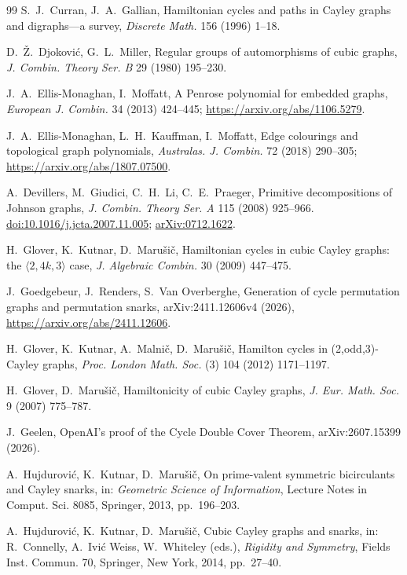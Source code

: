 \documentclass[11pt,a4paper]{article}
\theoremstyle{definition}
\theoremstyle{remark}
\begin{document}
\begin{thebibliography}{99}
 S.~J.~Curran, J.~A.~Gallian, Hamiltonian cycles and paths in Cayley graphs and digraphs---a survey, \emph{Discrete Math.} 156 (1996) 1--18.

 D.~\v{Z}.~Djokovi\'c, G.~L.~Miller, Regular groups of automorphisms of cubic graphs, \emph{J. Combin. Theory Ser. B} 29 (1980) 195--230.

 J.~A.~Ellis-Monaghan, I.~Moffatt, A Penrose polynomial for embedded graphs, \emph{European J. Combin.} 34 (2013) 424--445; \url{https://arxiv.org/abs/1106.5279}.

 J.~A.~Ellis-Monaghan, L.~H.~Kauffman, I.~Moffatt, Edge colourings and topological graph polynomials, \emph{Australas. J. Combin.} 72 (2018) 290--305; \url{https://arxiv.org/abs/1807.07500}.

 A.~Devillers, M.~Giudici, C.~H.~Li, C.~E.~Praeger, Primitive decompositions of Johnson graphs, \emph{J. Combin. Theory Ser. A} 115 (2008) 925--966.  \href{https://doi.org/10.1016/j.jcta.2007.11.005}{doi:10.1016/j.jcta.2007.11.005}; \href{https://arxiv.org/abs/0712.1622}{arXiv:0712.1622}.

 H.~Glover, K.~Kutnar, D.~Maru\v{s}i\v{c}, Hamiltonian cycles in cubic Cayley graphs: the $\langle 2,4k,3\rangle$ case, \emph{J. Algebraic Combin.} 30 (2009) 447--475.

 J.~Goedgebeur, J.~Renders, S.~Van Overberghe, Generation of cycle permutation graphs and permutation snarks, arXiv:2411.12606v4 (2026), \url{https://arxiv.org/abs/2411.12606}.

 H.~Glover, K.~Kutnar, A.~Malni\v{c}, D.~Maru\v{s}i\v{c}, Hamilton cycles in (2,odd,3)-Cayley graphs, \emph{Proc. London Math. Soc.} (3) 104 (2012) 1171--1197.

 H.~Glover, D.~Maru\v{s}i\v{c}, Hamiltonicity of cubic Cayley graphs, \emph{J. Eur. Math. Soc.} 9 (2007) 775--787.

 J.~Geelen, OpenAI's proof of the Cycle Double Cover Theorem, arXiv:2607.15399 (2026).

 A.~Hujdurovi\'c, K.~Kutnar, D.~Maru\v{s}i\v{c}, On prime-valent symmetric bicirculants and Cayley snarks, in: \emph{Geometric Science of Information}, Lecture Notes in Comput. Sci. 8085, Springer, 2013, pp.~196--203.

 A.~Hujdurovi\'c, K.~Kutnar, D.~Maru\v{s}i\v{c}, Cubic Cayley graphs and snarks, in: R.~Connelly, A.~Ivi\'c Weiss, W.~Whiteley (eds.), \emph{Rigidity and Symmetry}, Fields Inst. Commun. 70, Springer, New York, 2014, pp.~27--40.


\end{thebibliography}
\end{document}
